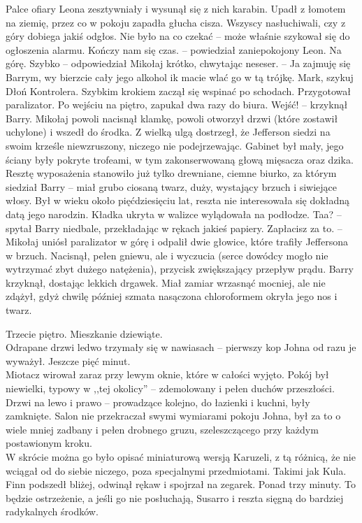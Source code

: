 \documentclass[../MAIN.tex]{subfiles}
\begin{document}
Palce ofiary Leona zesztywniały i wysunął się z nich karabin. Upadł z łomotem na ziemię, przez co w pokoju zapadła głucha cisza. Wszyscy nasłuchiwali, czy z góry dobiega jakiś odgłos. Nie było na co czekać -- może właśnie szykował się do ogłoszenia alarmu.
\sx Kończy nam się czas. -- powiedział zaniepokojony Leon.
\xx Na górę. Szybko -- odpowiedział Mikołaj krótko, chwytając neseser. -- Ja zajmuję się Barrym, wy bierzcie cały jego alkohol i\3k macie wlać go w tą trójkę. Mark, szykuj Dłoń Kontrolera.
\qd
Szybkim krokiem zaczął się wspinać po schodach. Przygotował paralizator.
Po wejściu na piętro, zapukał dwa razy do biura.
\sx Wejść! -- krzyknął Barry. \qd
Mikołaj powoli nacisnął klamkę, powoli otworzył drzwi (które zostawił uchylone) i wszedł do środka. Z wielką ulgą dostrzegł, że Jefferson siedzi na swoim krześle niewzruszony, niczego nie podejrzewając. Gabinet był mały, jego ściany były pokryte trofeami, w tym zakonserwowaną głową mięsacza oraz dzika.\\ Resztę wyposażenia stanowiło już tylko drewniane, ciemne biurko, za którym siedział Barry -- miał grubo ciosaną twarz, duży, wystający brzuch i siwiejące włosy. Był w wieku około pięćdziesięciu lat, reszta nie interesowała się dokładną datą jego narodzin. Kładka ukryta w walizce wylądowała na podłodze.
\sx Taa? -- spytał Barry niedbale, przekładając w rękach jakieś papiery.
\xx Zapłacisz za to. -- Mikołaj uniósł paralizator w górę i odpalił dwie głowice, które trafiły Jeffersona w brzuch.
\qd
Nacisnął, pełen gniewu, ale i wyczucia (serce dowódcy mogło nie wytrzymać zbyt dużego natężenia), przycisk zwiększający przepływ prądu. Barry krzyknął, dostając lekkich drgawek. Miał zamiar wrzasnąć mocniej, ale nie zdążył, gdyż chwilę później szmata nasączona chloroformem okryła jego nos i twarz.

Trzecie piętro. Mieszkanie dziewiąte. \\
Odrapane drzwi ledwo trzymały się w nawiasach -- pierwszy kop Johna od razu je wyważył. Jeszcze pięć minut. \\
Miotacz wirował zaraz przy lewym oknie, które w całości wyjęto. Pokój był niewielki, typowy w ,,tej okolicy'' -- zdemolowany i pełen duchów przeszłości. Drzwi na lewo i prawo -- prowadzące kolejno, do łazienki i kuchni, były zamknięte. Salon nie przekraczał swymi wymiarami pokoju Johna, był za to o wiele mniej zadbany i pełen drobnego gruzu, szeleszczącego przy każdym postawionym kroku. \\
W skrócie można go było opisać miniaturową wersją Karuzeli, z tą różnicą, że nie wciągał od do siebie niczego, poza specjalnymi przedmiotami. Takimi jak Kula.\\
Finn podszedł bliżej, odwinął rękaw i spojrzał na zegarek. Ponad trzy minuty. To będzie ostrzeżenie, a jeśli go nie posłuchają, Susarro i reszta sięgną do bardziej radykalnych środków.
\end{document}

